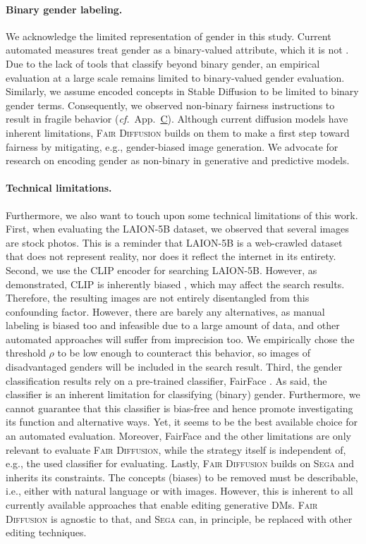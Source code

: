 \documentclass{article}%
\newcommand{\cf}{\emph{cf.}~}
\begin{document}
\paragraph{Binary gender labeling.} 
We acknowledge the limited representation of gender in this study.
Current automated measures
treat gender as a binary-valued attribute, which it is not \cite{wickham2023gender}. 
Due to the lack of tools that classify beyond binary gender, an empirical evaluation at a large scale remains limited to binary-valued gender evaluation. 
Similarly, we assume encoded concepts in Stable Diffusion to be limited to binary gender terms. Consequently, we observed non-binary fairness instructions to result in fragile behavior (\cf App.~\hyperref[sec:dif-setups]{C}).
Although current diffusion models have inherent limitations, \textsc{Fair Diffusion} builds on them to make a first step toward fairness by mitigating, e.g., gender-biased image generation. We advocate for research on encoding gender as non-binary in generative and predictive models.


\paragraph{Technical limitations.}
Furthermore, we also want to touch upon some technical limitations of this work. First, when evaluating the LAION-5B dataset, we observed that several images are stock photos. This is a reminder that LAION-5B is a web-crawled dataset that does not represent reality, nor does it reflect the internet in its entirety. 
Second, we use the CLIP encoder for searching LAION-5B. However, as demonstrated, CLIP is inherently biased \cite{wolfe22americanwhite,wolfe22markedness}, which may affect the search results. Therefore, the resulting images are not entirely disentangled from this confounding factor. However, there are barely any alternatives, as manual labeling is biased too and infeasible due to a large amount of data, and other automated approaches will suffer from imprecision too. We empirically chose the threshold $\rho$ to be low enough to counteract this behavior, so images of disadvantaged genders will be included in the search result.
Third, the gender classification results rely on a pre-trained classifier, FairFace \cite{fairface}. As said, the classifier is an inherent limitation for classifying (binary) gender. Furthermore, we cannot guarantee that this classifier is bias-free and hence promote investigating its function and alternative ways. Yet, it seems to be the best available choice for an automated evaluation. Moreover, FairFace and the other limitations are only relevant to evaluate \textsc{Fair Diffusion}, while the strategy itself is independent of, e.g., the used classifier for evaluating.
Lastly, \textsc{Fair Diffusion} builds on \textsc{Sega} and inherits its constraints. The concepts (biases) to be removed must be describable, i.e., either with natural language or with images. However, this is inherent to all currently available approaches that enable editing generative DMs. \textsc{Fair Diffusion} is agnostic to that, and \textsc{Sega} can, in principle, be replaced with other editing techniques.
\end{document}
